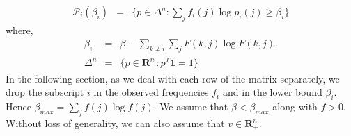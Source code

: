 \begin{eqnarray*}
\mathcal{P}_{i}(\beta_i) &=& \bigg\{p \in \Delta^n: \sum_{j}f_{i}(j)\log p_{i}(j) \geq \beta_i \bigg\}
\end{eqnarray*}
where,
\begin{eqnarray*}
\beta_i &=& \beta - \sum_{k \neq i} \sum_{j} F(k,j) \log F(k,j). \\
\Delta^n &=& \{p \in \textbf{R}^n_+ : p^T\textbf{1} = 1\}
\end{eqnarray*}
In the following section, as we deal with each row of the matrix separately, we drop the subscript $i$ in the observed frequencies $f_i$ and in the lower bound $\beta_i$. Hence $\beta_{max} = \sum_{j} f(j)\log f(j)$. We assume that $\beta < \beta_{max}$ along with $f > 0$.  Without loss of generality, we can also assume that $v \in \textbf{R}^n_+$.
